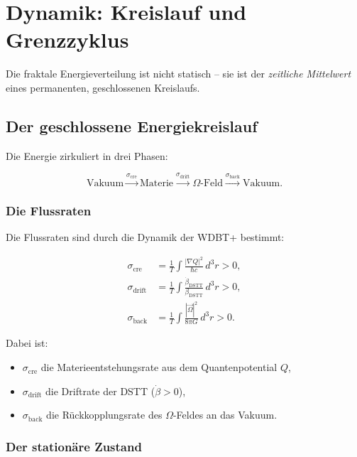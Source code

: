 \chapter{Dynamik: Kreislauf und Grenzzyklus}

Die fraktale Energieverteilung ist nicht statisch – sie ist der \emph{zeitliche Mittelwert} eines permanenten, geschlossenen Kreislaufs.

\section{Der geschlossene Energiekreislauf}

Die Energie zirkuliert in drei Phasen:

\begin{equation}
\text{Vakuum} \xrightarrow{\sigma_{\text{cre}}} \text{Materie} \xrightarrow{\sigma_{\text{drift}}} \Omega\text{-Feld} \xrightarrow{\sigma_{\text{back}}} \text{Vakuum}. \tag{3.1}
\end{equation}

\subsection{Die Flussraten}

Die Flussraten sind durch die Dynamik der WDBT+ bestimmt:

\begin{align}
\sigma_{\text{cre}} &= \frac{1}{T} \int \frac{|\nabla Q|^2}{\hbar c} \, d^3r > 0, \tag{3.2} \\
\sigma_{\text{drift}} &= \frac{1}{T} \int \frac{\dot{\beta}_{\text{DSTT}}}{\beta_{\text{DSTT}}} \, d^3r > 0, \tag{3.3} \\
\sigma_{\text{back}} &= \frac{1}{T} \int \frac{|\vec{\Omega}|^2}{8\pi G} \, d^3r > 0. \tag{3.4}
\end{align}

Dabei ist:
\begin{itemize}
    \item \(\sigma_{\text{cre}}\) die Materieentstehungsrate aus dem Quantenpotential \(Q\),
    \item \(\sigma_{\text{drift}}\) die Driftrate der DSTT (\( \dot{\beta} > 0 \)),
    \item \(\sigma_{\text{back}}\) die Rückkopplungsrate des \(\Omega\)-Feldes an das Vakuum.
\end{itemize}

\subsection{Der stationäre Zustand}

